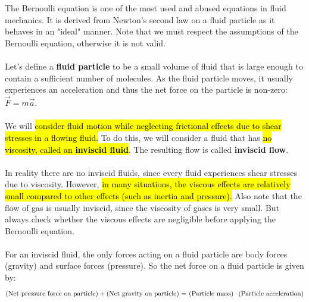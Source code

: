 ﻿\documentclass[12pt]{article}
\begin{document}
\section*{}
The Bernoulli equation is one of the most used and abused equations in fluid mechanics. It is derived from Newton's second law on a fluid particle as it behaves in an "ideal" manner. Note that we must respect the assumptions of the Bernoulli equation, otherwise it is not valid.\\\\
Let's define a \textbf{fluid particle} to be a small volume of fluid that is large enough to contain a sufficient number of molecules. As the fluid particle moves, it usually experiences an acceleration and thus the net force on the particle is non-zero: $\vec{F} = m\vec{a}$.\\\\
We will \hl{consider fluid motion while neglecting frictional effects due to shear stresses in a flowing fluid.} To do this, we will consider a fluid that has \hl{no viscosity, called an \textbf{inviscid fluid}}. The resulting flow is called \textbf{inviscid flow}.\\\\
In reality there are no inviscid fluids, since every fluid experiences shear stresses due to viscosity. However, \hl{in many situations, the viscous effects are relatively small compared to other effects (such as inertia and pressure).} Also note that the flow of gas is usually inviscid, since the viscosity of gases is very small. But always check whether the viscous effects are negligible before applying the Bernoulli equation.\\\\
For an inviscid fluid, the only forces acting on a fluid particle are body forces (gravity) and surface forces (pressure). So the net force on a fluid particle is given by:
\[\text{(Net pressure force on particle)} + \text{(Net gravity on particle) = \text{(Particle mass)}}\cdot\text{(Particle acceleration)}\]
\end{document}
